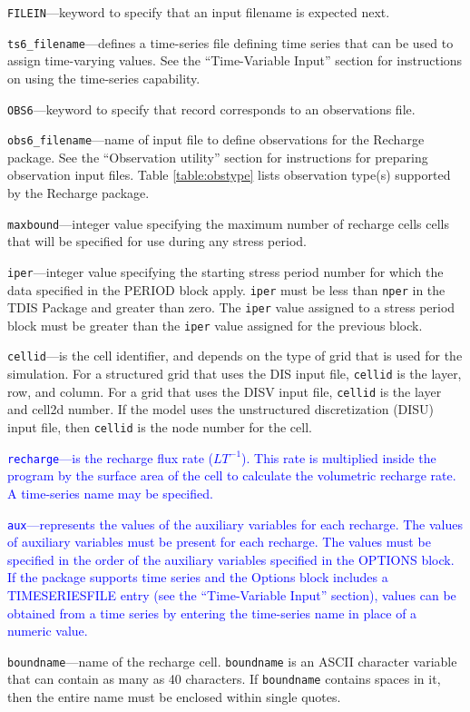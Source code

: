 \item \texttt{FILEIN}---keyword to specify that an input filename is expected next.

\item \texttt{ts6\_filename}---defines a time-series file defining time series that can be used to assign time-varying values. See the ``Time-Variable Input'' section for instructions on using the time-series capability.

\item \texttt{OBS6}---keyword to specify that record corresponds to an observations file.

\item \texttt{obs6\_filename}---name of input file to define observations for the Recharge package. See the ``Observation utility'' section for instructions for preparing observation input files. Table \ref{table:obstype} lists observation type(s) supported by the Recharge package.

\item \texttt{maxbound}---integer value specifying the maximum number of recharge cells cells that will be specified for use during any stress period.

\item \texttt{iper}---integer value specifying the starting stress period number for which the data specified in the PERIOD block apply.  \texttt{iper} must be less than \texttt{nper} in the TDIS Package and greater than zero.  The \texttt{iper} value assigned to a stress period block must be greater than the \texttt{iper} value assigned for the previous block.

\item \texttt{cellid}---is the cell identifier, and depends on the type of grid that is used for the simulation.  For a structured grid that uses the DIS input file, \texttt{cellid} is the layer, row, and column.   For a grid that uses the DISV input file, \texttt{cellid} is the layer and cell2d number.  If the model uses the unstructured discretization (DISU) input file, then \texttt{cellid} is the node number for the cell.

\item \textcolor{blue}{\texttt{recharge}---is the recharge flux rate ($LT^{-1}$).  This rate is multiplied inside the program by the surface area of the cell to calculate the volumetric recharge rate. A time-series name may be specified.}

\item \textcolor{blue}{\texttt{aux}---represents the values of the auxiliary variables for each recharge. The values of auxiliary variables must be present for each recharge. The values must be specified in the order of the auxiliary variables specified in the OPTIONS block.  If the package supports time series and the Options block includes a TIMESERIESFILE entry (see the ``Time-Variable Input'' section), values can be obtained from a time series by entering the time-series name in place of a numeric value.}

\item \texttt{boundname}---name of the recharge cell.  \texttt{boundname} is an ASCII character variable that can contain as many as 40 characters.  If \texttt{boundname} contains spaces in it, then the entire name must be enclosed within single quotes.


